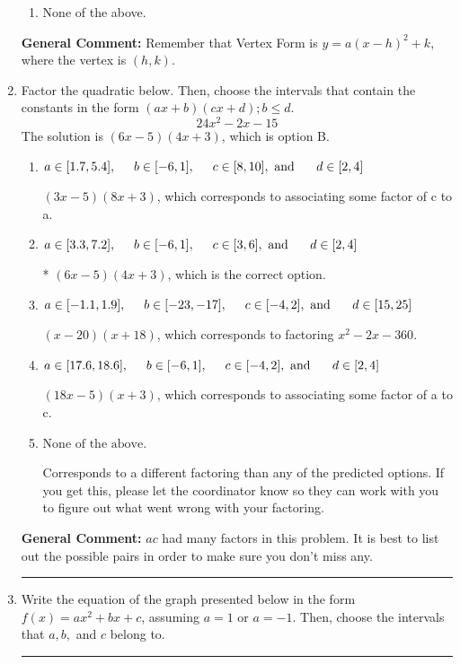 \documentclass{extbook}[14pt]
\newcommand{\litem}[1]{\item #1

\rule{\textwidth}{0.4pt}}
\begin{document}
\begin{enumerate}
{\begin{enumerate}[label=\Alph*.]
\begin{multicols}{2}
\end{multicols}\item None of the above.\end{enumerate}
\textbf{General Comment:} Remember that Vertex Form is $y = a(x-h)^2+k$, where the vertex is $(h, k)$.
}
\litem{
Factor the quadratic below. Then, choose the intervals that contain the constants in the form $(ax+b)(cx+d); b \leq d.$
\[ 24x^{2} -2 x -15 \]The solution is \( (6x -5)(4x + 3) \), which is option B.\begin{enumerate}[label=\Alph*.]
\item \( a \in [1.7, 5.4], \hspace*{5mm} b \in [-6, 1], \hspace*{5mm} c \in [8, 10], \text{ and } \hspace*{5mm} d \in [2, 4] \)

 $(3x -5)(8x + 3)$, which corresponds to associating some factor of c to a.
\item \( a \in [3.3, 7.2], \hspace*{5mm} b \in [-6, 1], \hspace*{5mm} c \in [3, 6], \text{ and } \hspace*{5mm} d \in [2, 4] \)

* $(6x -5)(4x + 3)$, which is the correct option.
\item \( a \in [-1.1, 1.9], \hspace*{5mm} b \in [-23, -17], \hspace*{5mm} c \in [-4, 2], \text{ and } \hspace*{5mm} d \in [15, 25] \)

 $(x -20)(x + 18)$, which corresponds to factoring $x^{2} -2 x -360$.
\item \( a \in [17.6, 18.6], \hspace*{5mm} b \in [-6, 1], \hspace*{5mm} c \in [-4, 2], \text{ and } \hspace*{5mm} d \in [2, 4] \)

 $(18x -5)(x + 3)$, which corresponds to associating some factor of a to c.
\item \( \text{None of the above.} \)

 Corresponds to a different factoring than any of the predicted options. If you get this, please let the coordinator know so they can work with you to figure out what went wrong with your factoring.
\end{enumerate}

\textbf{General Comment:} $ac$ had many factors in this problem. It is best to list out the possible pairs in order to make sure you don't miss any.
}
\litem{
Write the equation of the graph presented below in the form $f(x)=ax^2+bx+c$, assuming  $a=1$ or $a=-1$. Then, choose the intervals that $a, b,$ and $c$ belong to.

}
\end{enumerate}
\end{document}
